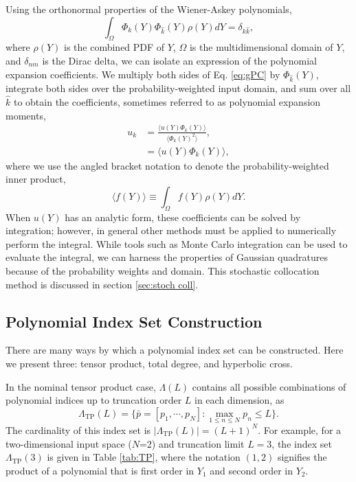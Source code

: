 Using the orthonormal properties of the Wiener-Askey polynomials,
\begin{equation}
  \int_\Omega \Phi_k(Y)\Phi_{\hat k}(Y) \rho(Y) dY = \delta_{k\hat k},
\end{equation}
where $\rho(Y)$ is the combined PDF of $Y$, $\Omega$ is the multidimensional domain of $Y$, and $\delta_{nm}$
is the Dirac delta, we can isolate an expression of the polynomial expansion coefficients.
We multiply both sides of Eq. \ref{eq:gPC} by
$\Phi_{\hat k}(Y)$, integrate both sides over the probability-weighted input domain, and sum over all $\hat k$
to obtain the coefficients, sometimes referred to as polynomial expansion moments,
\begin{align}\label{eq:polycoeff}
  u_k &= \frac{\langle u(Y)\Phi_k(Y) \rangle}{\langle \Phi_k(Y)^2 \rangle},\\
      &= \langle u(Y)\Phi_k(Y) \rangle,
\end{align}
where we use the angled bracket notation to denote the probability-weighted inner product,
\begin{equation}
  \langle f(Y) \rangle \equiv \int_\Omega f(Y)\rho(Y) dY.
\end{equation}
When $u(Y)$ has an analytic form, these coefficients can be solved by integration; however, in general other
methods must be applied to numerically perform the integral.  While tools such as Monte Carlo integration can
be used to evaluate the integral, we can harness the properties of Gaussian quadratures because of the
probability weights and domain.  This stochastic collocation method is discussed in section \ref{sec:stoch
coll}.


\subsection{Polynomial Index Set Construction}\label{sec:index sets}
There are many ways by which a polynomial index set can be constructed.  Here we present three: tensor
product, total degree, and hyperbolic cross.

In the nominal tensor
product case, $\Lambda(L)$ contains all possible combinations of polynomial indices up to truncation order $L$ in each
dimension, as
\begin{equation}
  \Lambda_\text{TP}(L)=\Big\{\bar p=[p_1,\cdots,p_N]: \max_{1\leq n\leq N}p_n\leq L
\Big\}.
\end{equation}
The cardinality of this index set is $|\Lambda_\text{TP}(L)|=(L+1)^N$. For example, for a two-dimensional
input space ($N$=2) and truncation limit $L=3$, the index set $\Lambda_\text{TP}(3)$ is given in Table
\ref{tab:TP}, where the notation $(1,2)$ signifies the product of a polynomial that is first order in $Y_1$
and second order in $Y_2$.

